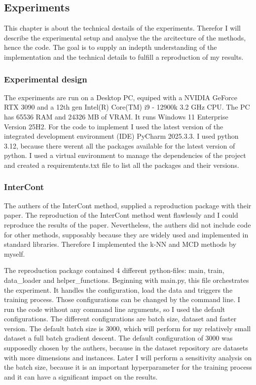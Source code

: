 
\subsection{Experiments}
This chapter is about the technical destails of the experiments.
Therefor I will describe the experimental setup and analyse the the arcitecture of the methods, hence the code.
The goal is to supply an indepth understanding of the implementation and the technical details to fulfill a reproduction of my results. 


\subsubsection*{Experimental design}
The experiments are run on a Desktop PC, equiped with a NVIDIA GeForce RTX 3090 and a 12th gen Intel(R) Core(TM) i9 - 12900k 3.2 GHz CPU.
The PC has 65536 RAM and 24326 MB of VRAM. 
It runs Windows 11 Enterprise Version 25H2.
For the code to implement I used the latest version of the integrated development environment (IDE) PyCharm 2025.3.3.
I used python 3.12, because there werent all the packages available for the latest version of python.
I used a virtual environment to manage the dependencies of the project and created a requiremtents.txt file to list all the packages and their versions.


\subsubsection*{InterCont}
The authers of the InterCont method, supplied a reproduction package with their paper. 
The reproduction of the InterCont method went flawlessly and I could reproduce the results of the paper.
Nevertheless, the authers did not include code for other methods, supposably because they are widely used and implemented in standard libraries.
Therefore I implemented the k-NN and MCD methods by myself.


The reproduction package contained 4 different python-files: main, train, data\_loader and helper\_functions.
Beginning with main.py, this file orchestrates the experiment. 
It handles the configuration, load the data and triggers the training process.
Those configurations can be changed by the command line.
I run the code without any command line arguments, so I used the default configurations.
The different configurations are batch size, dataset and faster version.
The default batch size is 3000, which will perform for my relatively small dataset a full batch gradient descent.
The default configuration of 3000 was supposedly chosen by the authers, because in the dataset repository are datasets with more dimensions and instances.
Later I will perform a sensitivity analysis on the batch size, because it is an important hyperparameter for the training process and it can have a significant impact on the results. 


